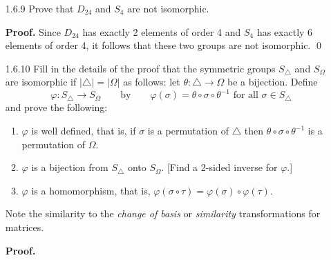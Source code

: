 \begin{enumerate}
      \textbf{Proof.} Let $n$ and $m$ be unequal positive integers so that
      $n! \neq m!$; i.e., $n! = |S_n| \neq |S_m| = m!$. Thus no bijective map
      can exist between $S_n$ and $S_m$, so that these two groups are not
      isomorphic. \qed
   \item[1.6.9]   Prove that $D_{24}$ and $S_4$ are not isomorphic.

      \textbf{Proof.} Since $D_{24}$ has exactly 2 elements of order 4 and $S_4$
      has exactly 6 elements of order 4, it follows that these two groups are
      not isomorphic. \qed
   \item[1.6.10]  Fill in the details of the proof that the symmetric groups
                  $S_\triangle$ and $S_\Omega$ are isomorphic if
                  $|\triangle| = |\Omega|$ as follows: let
                  $\theta : \triangle \rightarrow \Omega$ be a bijection. Define
                  $$\varphi : S_\triangle \rightarrow S_\Omega \qquad
                    \text{by} \qquad \varphi(\sigma) = \theta \circ \sigma \circ 
                    \theta^{-1} \text{ for all } \sigma \in S_\triangle$$
                  and prove the following:
                  \begin{enumerate}
                     \item $\varphi$ is well defined, that is, if $\sigma$ is a
                           permutation of $\triangle$ then
                           $\theta\circ\sigma\circ\theta^{-1}$ is a permutation
                           of $\Omega$.
                     \item $\varphi$ is a bijection from $S_\triangle$ onto
                           $S_\Omega$. [Find a 2-sided inverse for $\varphi$.]
                     \item $\varphi$ is a homomorphism, that is,
                           $\varphi(\sigma\circ\tau) =
                            \varphi(\sigma)\circ\varphi(\tau)$.
                  \end{enumerate}
                  Note the similarity to the \textit{change of basis} or
                  \textit{similarity} transformations for matrices.

      \textbf{Proof.}


\end{enumerate}
